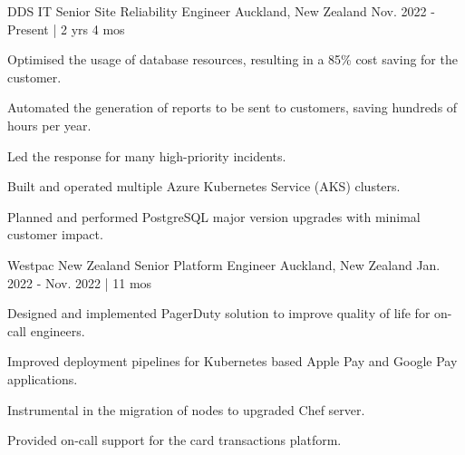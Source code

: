 


\begin{cventries}


\cventry
{DDS IT} %
{Senior Site Reliability Engineer} %
{Auckland, New Zealand} %
{Nov. 2022 - Present | 2 yrs 4 mos} %
{ %
\begin{cvitems}
  \item {Optimised the usage of database resources, resulting in a 85\% cost saving for the customer.}
  \item {Automated the generation of reports to be sent to customers, saving hundreds of hours per year.}
  \item {Led the response for many high-priority incidents.}
  \item {Built and operated multiple Azure Kubernetes Service (AKS) clusters.}
  \item {Planned and performed PostgreSQL major version upgrades with minimal customer impact.}
  \end{cvitems}
}

\cventry
{Westpac New Zealand} %
{Senior Platform Engineer} %
{Auckland, New Zealand} %
{Jan. 2022 - Nov. 2022 | 11 mos} %
{ %
\begin{cvitems}
\item {Designed and implemented PagerDuty solution to improve quality of life for on-call engineers.}
\item {Improved deployment pipelines for Kubernetes based Apple Pay and Google Pay applications.}
\item {Instrumental in the migration of nodes to upgraded Chef server.}
\item {Provided on-call support for the card transactions platform.}
\end{cvitems}
}


\end{cventries}
